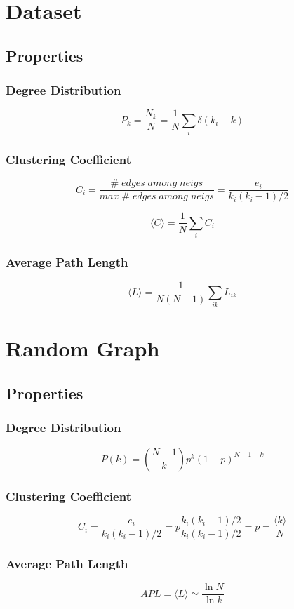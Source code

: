 \documentclass[a4paper,titlepage,11pt]{article}
\begin{document}
\section{Dataset}
\subsection{Properties}
\subsubsection{Degree Distribution}
\[
  P_k = \frac{N_k}{N} = \frac{1}{N}\sum_{i}{\delta(k_i-k)}
\]
\subsubsection{Clustering Coefficient}
\[
  C_i = \frac{\#\; edges\; among\; neigs}{max\; \# \; edges\; among \; neigs} = \frac{e_i}{k_i(k_i-1)/2}
\]

\[
  \langle C\rangle = \frac{1}{N}\sum_{i}{C_i}
\]
\subsubsection{Average Path Length}
\[
  \langle L\rangle = \frac{1}{N(N-1)}\sum_{ik}{L_{ik}}
\]

\section{Random Graph}
\subsection{Properties}
\subsubsection{Degree Distribution}
\[
  P(k) = {{N-1}\choose{k}} p^{k}(1-p)^{N-1-k}
\]
\subsubsection{Clustering Coefficient}
\[
  C_i = \frac{e_i}{k_i(k_i-1)/2} = p \frac{k_i(k_i-1)/2}{k_i(k_i-1)/2} = p = \frac{\langle k\rangle}{N} 
\]
\subsubsection{Average Path Length}
\[
  APL = \langle L\rangle \simeq \frac{\ln{N}}{\ln{k}}
\]
\end{document}
